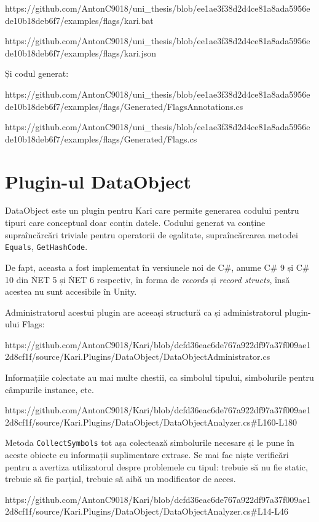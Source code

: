 \documentclass{report}
\begin{document}
https://github.com/AntonC9018/uni_thesis/blob/ee1ae3f38d2d4ce81a8ada5956ede10b18deb6f7/examples/flags/kari.bat

https://github.com/AntonC9018/uni_thesis/blob/ee1ae3f38d2d4ce81a8ada5956ede10b18deb6f7/examples/flags/kari.json


Și codul generat:

https://github.com/AntonC9018/uni_thesis/blob/ee1ae3f38d2d4ce81a8ada5956ede10b18deb6f7/examples/flags/Generated/FlagsAnnotations.cs

https://github.com/AntonC9018/uni_thesis/blob/ee1ae3f38d2d4ce81a8ada5956ede10b18deb6f7/examples/flags/Generated/Flags.cs

\section{Plugin-ul DataObject}

DataObject este un plugin pentru Kari care permite generarea codului pentru tipuri care conceptual doar conțin datele.
Codului generat va conține supraîncărcări triviale pentru operatorii de egalitate, supraîncărcarea metodei \texttt{Equals}, \texttt{GetHashCode}.

De fapt, aceasta a fost implementat în versiunele noi de C\#, anume C\# 9 și C\# 10 din \. NET 5 și \. NET 6 respectiv, în forma de \emph{records} și \emph{record structs}, însă acestea nu sunt accesibile în Unity.\cite{records_in_csharp}

Administratorul acestui plugin are aceeași structură ca și administratorul plugin-ului Flags:

https://github.com/AntonC9018/Kari/blob/dcfd36eac6de767a922df97a37f009ae12d8cf1f/source/Kari.Plugins/DataObject/DataObjectAdministrator.cs

Informațiile colectate au mai multe chestii, ca simbolul tipului, simbolurile pentru câmpurile instance, etc.

https://github.com/AntonC9018/Kari/blob/dcfd36eac6de767a922df97a37f009ae12d8cf1f/source/Kari.Plugins/DataObject/DataObjectAnalyzer.cs#L160-L180

Metoda \texttt{CollectSymbols} tot așa colectează simbolurile necesare și le pune în aceste obiecte cu informații suplimentare extrase.
Se mai fac niște verificări pentru a avertiza utilizatorul despre problemele cu tipul: trebuie să nu fie static, trebuie să fie parțial, trebuie să aibă un modificator de acces.

https://github.com/AntonC9018/Kari/blob/dcfd36eac6de767a922df97a37f009ae12d8cf1f/source/Kari.Plugins/DataObject/DataObjectAnalyzer.cs#L14-L46
\end{document}
